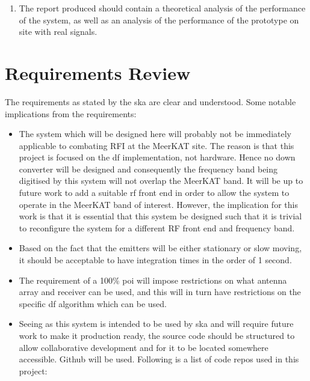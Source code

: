 \begin{enumerate}
  \item The report produced should contain a theoretical analysis of the performance of the system, as well as an analysis of the performance of the prototype on site with real signals. 
\end{enumerate}

\section{Requirements Review}
The requirements as stated by the \gls{ska} are clear and understood. Some notable implications from the requirements:

\begin{itemize}
  \item The system which will be designed here will probably not be immediately applicable to combating RFI at the MeerKAT site. The reason is that this project is focused on the \gls{df} implementation, not hardware. Hence no down converter will be designed and consequently the frequency band being digitised by this system will not overlap the MeerKAT band. 
    It will be up to future work to add a suitable \gls{rf} front end in order to allow the system to operate in the MeerKAT band of interest. However, the implication for this work is that it is essential that this system be designed such that it is trivial to reconfigure the system for a different RF front end and frequency band. 

  \item Based on the fact that the emitters will be either stationary or slow moving, it should be acceptable to have integration times in the order of 1 second. 

  \item The requirement of a 100\% \gls{poi} will impose restrictions on what antenna array and receiver can be used, and this will in turn have restrictions on the specific \gls{df} algorithm which can be used. 

  \item Seeing as this system is intended to be used by \gls{ska} and will require future work to make it production ready, the source code should be structured to allow collaborative development and for it to be located somewhere accessible. Github will be used. Following is a list of code repos used in this project:

\end{itemize}

